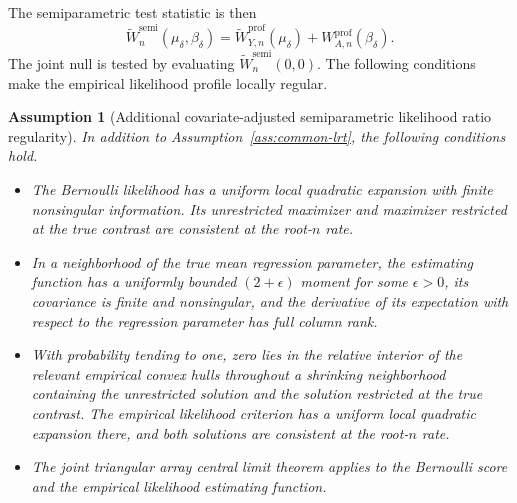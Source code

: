 \documentclass[11pt]{article}
\newtheorem{assumption}{Assumption}
\begin{document}
The semiparametric test statistic is then
\begin{equation*}
  \widetilde{W}_n^{\mathrm{semi}}(\mu_\delta, \beta_\delta)
  = \widetilde{W}_{Y,n}^{\mathrm{prof}}(\mu_\delta) + W_{A,n}^{\mathrm{prof}}(\beta_\delta).
\end{equation*}
The joint null is tested by evaluating $\widetilde{W}_n^{\mathrm{semi}}(0,0)$. The following conditions make the empirical likelihood profile locally regular.

\begin{assumption}[Additional covariate-adjusted semiparametric likelihood ratio regularity]\label{ass:covariate-adjusted-splrt}
In addition to Assumption~\ref{ass:common-lrt}, the following conditions hold.
\begin{itemize}
  \item The Bernoulli likelihood has a uniform local quadratic expansion with finite nonsingular information. Its unrestricted maximizer and maximizer restricted at the true contrast are consistent at the root-$n$ rate.
  \item In a neighborhood of the true mean regression parameter, the estimating function has a uniformly bounded $(2+\epsilon)$ moment for some $\epsilon>0$, its covariance is finite and nonsingular, and the derivative of its expectation with respect to the regression parameter has full column rank.
  \item With probability tending to one, zero lies in the relative interior of the relevant empirical convex hulls throughout a shrinking neighborhood containing the unrestricted solution and the solution restricted at the true contrast. The empirical likelihood criterion has a uniform local quadratic expansion there, and both solutions are consistent at the root-$n$ rate.
  \item The joint triangular array central limit theorem applies to the Bernoulli score and the empirical likelihood estimating function.
\end{itemize}
\end{assumption}
\end{document}

